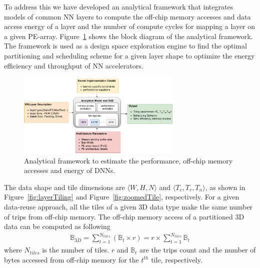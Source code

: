 \documentclass[a4paper,10pt]{article}
\newcommand{\numBytesOffChip}{\mathbb{B}}
\begin{document}
To address this we have developed an analytical framework that integrates models of common NN layers to compute the off-chip memory accesses and data access energy of a layer and the number of compute cycles for mapping a layer on a given PE-array. Figure~\ref{fig:analyticalModel} shows the block diagram of the analytical framework. The framework is used as a design space exploration engine to find the optimal partitioning and scheduling scheme for a given layer shape to optimize the energy efficiency and throughput of NN accelerators. 
\begin{figure}[!htb]
	\centering
    \captionsetup{font=sf}	
	\includegraphics[width=0.7\textwidth]{analyticalModel}
	\caption{Analytical framework to estimate the performance, off-chip memory accesses and energy of DNNs.}
	\label{fig:analyticalModel}
\end{figure}
The data shape and tile dimensions are $\langle W,H,N\rangle$ and $\langle T_c,T_r,T_n\rangle$, as shown in Figure~\ref{fig:layerTiling} and Figure~\ref{fig:zoomedTile}, respectively. For a given data-reuse approach, all the tiles of a given 3D data type make the same number of trips from off-chip memory. The off-chip memory access of a partitioned 3D data can be computed as following
\begin{align}\label{eq:BasicOffChip3DDataAccess}
	\numBytesOffChip_{3D}{=}\sum_{t=1}^{N_{tiles}}(\numBytesOffChip_{t}{\times}r){=}r{\times} \sum_{t=1}^{N_{tiles}}{\numBytesOffChip_{t}}
\end{align}
where $N_{tiles}$ is the number of tiles. $r$ and $\numBytesOffChip_{t}$ are the trips count and the number of bytes accessed from off-chip memory for the $t^{th}$ tile, respectively. 
\end{document}
